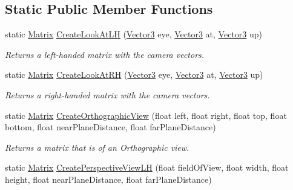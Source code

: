 \subsection*{Static Public Member Functions}
\begin{DoxyCompactItemize}
\item 
\hypertarget{struct_jade_1_1_math_1_1_matrix_ad97b1a3bfacaa82ccaab538f29b46004}{}static \hyperlink{struct_jade_1_1_math_1_1_matrix}{Matrix} \hyperlink{struct_jade_1_1_math_1_1_matrix_ad97b1a3bfacaa82ccaab538f29b46004}{Create\+Look\+At\+L\+H} (\hyperlink{struct_jade_1_1_math_1_1_vector3}{Vector3} eye, \hyperlink{struct_jade_1_1_math_1_1_vector3}{Vector3} at, \hyperlink{struct_jade_1_1_math_1_1_vector3}{Vector3} up)\label{struct_jade_1_1_math_1_1_matrix_ad97b1a3bfacaa82ccaab538f29b46004}

\begin{DoxyCompactList}\small\item\em Returns a left-\/handed matrix with the camera vectors. \end{DoxyCompactList}\item 
\hypertarget{struct_jade_1_1_math_1_1_matrix_aa6701069b3c78409fd8621b888892aae}{}static \hyperlink{struct_jade_1_1_math_1_1_matrix}{Matrix} \hyperlink{struct_jade_1_1_math_1_1_matrix_aa6701069b3c78409fd8621b888892aae}{Create\+Look\+At\+R\+H} (\hyperlink{struct_jade_1_1_math_1_1_vector3}{Vector3} eye, \hyperlink{struct_jade_1_1_math_1_1_vector3}{Vector3} at, \hyperlink{struct_jade_1_1_math_1_1_vector3}{Vector3} up)\label{struct_jade_1_1_math_1_1_matrix_aa6701069b3c78409fd8621b888892aae}

\begin{DoxyCompactList}\small\item\em Returns a right-\/handed matrix with the camera vectors. \end{DoxyCompactList}\item 
\hypertarget{struct_jade_1_1_math_1_1_matrix_a7b499218857c8ddcb5bfe7353ade41dd}{}static \hyperlink{struct_jade_1_1_math_1_1_matrix}{Matrix} \hyperlink{struct_jade_1_1_math_1_1_matrix_a7b499218857c8ddcb5bfe7353ade41dd}{Create\+Orthographic\+View} (float left, float right, float top, float bottom, float near\+Plane\+Distance, float far\+Plane\+Distance)\label{struct_jade_1_1_math_1_1_matrix_a7b499218857c8ddcb5bfe7353ade41dd}

\begin{DoxyCompactList}\small\item\em Returns a matrix that is of an Orthographic view. \end{DoxyCompactList}\item 
\hypertarget{struct_jade_1_1_math_1_1_matrix_ad114ea0e0700ef91f40ed7d40bcb5a9a}{}static \hyperlink{struct_jade_1_1_math_1_1_matrix}{Matrix} \hyperlink{struct_jade_1_1_math_1_1_matrix_ad114ea0e0700ef91f40ed7d40bcb5a9a}{Create\+Perspective\+View\+L\+H} (float field\+Of\+View, float width, float height, float near\+Plane\+Distance, float far\+Plane\+Distance)\label{struct_jade_1_1_math_1_1_matrix_ad114ea0e0700ef91f40ed7d40bcb5a9a}


\end{DoxyCompactItemize}
